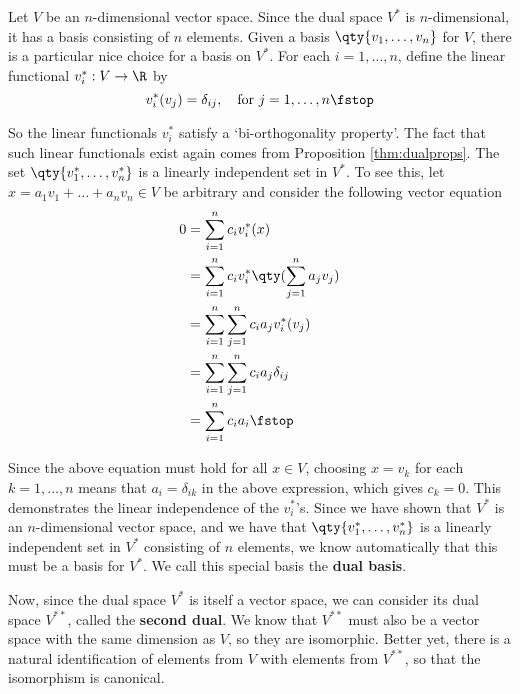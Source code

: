 Let \( V \) be an \( n \)-dimensional vector space. Since the dual space \( V^* \) is \( n \)-dimensional, it has a basis consisting of \( n \) elements. Given a basis \( \qty{v_1,\dots,v_n} \) for \( V \), there is a particular nice choice for a basis on \( V^* \). For each \( i=1,\dots,n \), define the linear functional \( v^*_i:V\to\R \) by
\[ v^*_i(v_j)=\delta_{ij}, \quad\text{for }j=1,\dots,n\fstop \]

So the linear functionals \( v^*_i \) satisfy a `bi-orthogonality property'. The fact that such linear functionals exist again comes from Proposition \ref{thm:dualprops}. The set \( \qty{v^*_1,\dots,v^*_n} \) is a linearly independent set in \( V^* \). To see this, let \( x=a_1v_1+\dots+a_nv_n\in V \) be arbitrary and consider the following vector equation
\begin{align*}
  0&= \sum_{i=1}^nc_iv^*_i(x)\\
  &= \sum_{i=1}^nc_iv^*_i\qty(\sum_{j=1}^na_jv_j)\\
  &= \sum_{i=1}^n\sum_{j=1}^nc_ia_jv^*_i(v_j)\\
  &= \sum_{i=1}^n\sum_{j=1}^nc_ia_j\delta_{ij}\\
  &= \sum_{i=1}^n c_ia_i\fstop
\end{align*}

Since the above equation must hold for all \( x\in V \), choosing \( x=v_k \) for each \( k=1,\dots,n \) means that \( a_i=\delta_{ik} \) in the above expression, which gives \( c_k=0 \). This demonstrates the linear independence of the \( v^*_i \)'s. Since we have shown that \( V^* \) is an \( n \)-dimensional vector space, and we have that \( \qty{v^*_1,\dots,v^*_n} \) is a linearly independent set in \( V^* \) consisting of \( n \) elements, we know automatically that this must be a basis for \( V^* \). We call this special basis the \textbf{dual basis}.

\vspace{3mm}

Now, since the dual space \( V^* \) is itself a vector space, we can consider its dual space \( V^{**} \), called the \textbf{second dual}. We know that \( V^{**} \) must also be a vector space with the same dimension as \( V \), so they are isomorphic. Better yet, there is a natural identification of elements from \( V \) with elements from \( V^{**} \), so that the isomorphism is canonical.

